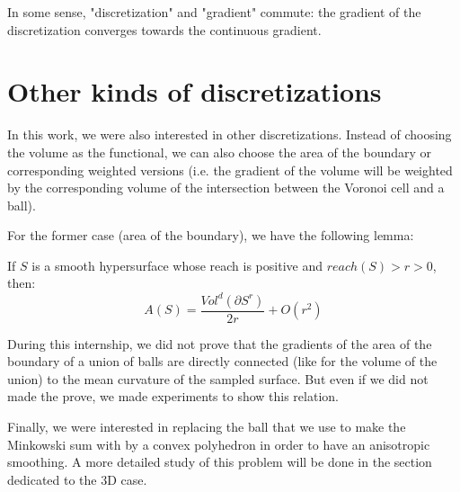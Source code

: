 In some sense, "discretization" and "gradient" commute: the gradient of the
discretization converges towards the continuous gradient.


\section{Other kinds of discretizations}


In this work, we were also interested in other discretizations. Instead of
choosing the volume as the functional, we can also choose the area of the
boundary or corresponding weighted versions (i.e. the gradient of the volume
will be weighted by the corresponding volume of the intersection between the
Voronoi cell and a ball).

For the former case (area of the boundary), we have the following lemma:
\begin{lemma}
    If $ S $ is a smooth hypersurface whose reach is positive and $ reach(S) > r
    > 0 $, then:
    \begin{equation}
        A(S) = \frac{Vol^d(\partial S^r)}{2r} + O(r^2)
    \end{equation}
\end{lemma}

During this internship, we did not prove that the gradients of the area of the
boundary of a union of balls are directly connected (like for the volume of the
union) to the mean curvature of the sampled surface. But even if we did not
made the prove, we made experiments to show this relation.

Finally, we were interested in replacing the ball that we use to make the
Minkowski sum with by a convex polyhedron in order to have an anisotropic
smoothing. A more detailed study of this problem will be done in the section
dedicated to the 3D case.

